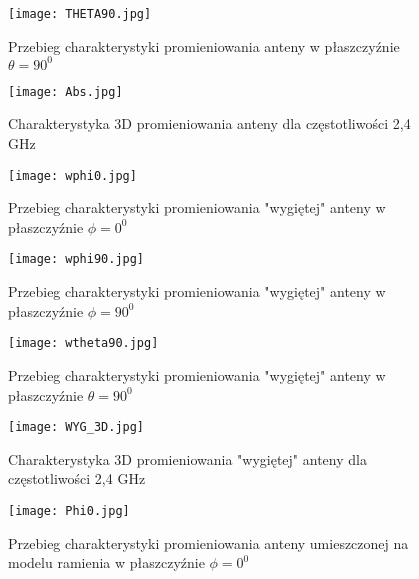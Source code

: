 \noindent
\newline

\begin{figure}[H]
\centering
	\texttt{[image: THETA90.jpg]}
	\caption{Przebieg charakterystyki promieniowania anteny w płaszczyźnie $\theta = 90^{0}$}
\end{figure}



\begin{figure}[H]
\centering
	\texttt{[image: Abs.jpg]}
	\caption{Charakterystyka 3D promieniowania anteny dla częstotliwości 2,4 GHz}
\end{figure}









\begin{figure}[H]
\centering
	\texttt{[image: wphi0.jpg]}
	\caption{Przebieg charakterystyki promieniowania "wygiętej" anteny w płaszczyźnie $\phi = 0^{0}$}
\end{figure}


\begin{figure}[H]
\centering
	\texttt{[image: wphi90.jpg]}
	\caption{Przebieg charakterystyki promieniowania "wygiętej" anteny w płaszczyźnie $\phi = 90^{0}$}
\end{figure}


\noindent
\newline
\begin{figure}[H]
\centering
	\texttt{[image: wtheta90.jpg]}
	\caption{Przebieg charakterystyki promieniowania "wygiętej" anteny w płaszczyźnie $\theta = 90^{0}$}
\end{figure}

\begin{figure}[H]
\centering
	\texttt{[image: WYG\_3D.jpg]}
	\caption{Charakterystyka 3D promieniowania "wygiętej" anteny dla częstotliwości 2,4 GHz}
\end{figure}








\noindent
\newline

\begin{figure}[H]
\centering
	\texttt{[image: Phi0.jpg]}
	\caption{Przebieg charakterystyki promieniowania anteny umieszczonej na modelu ramienia w płaszczyźnie $\phi = 0^{0}$}
\end{figure}


